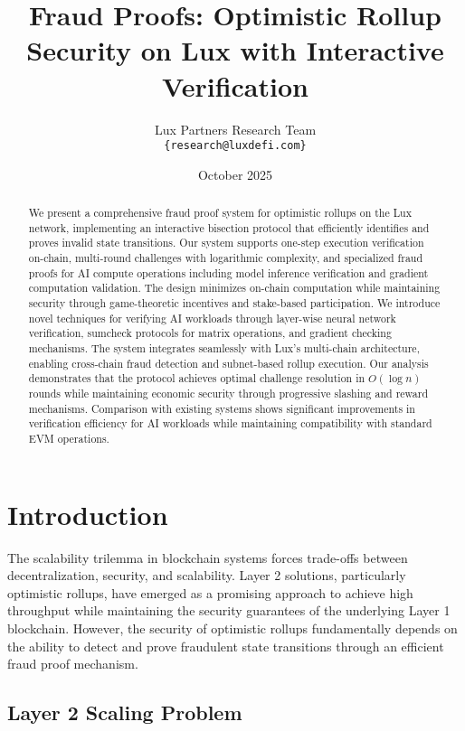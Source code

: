\documentclass[11pt,a4paper]{article}
\title{Fraud Proofs: Optimistic Rollup Security on Lux with Interactive Verification}
\author{Lux Partners Research Team\\
\texttt{\{research@luxdefi.com\}}}
\date{October 2025}
\theoremstyle{definition}
\begin{document}
\maketitle

\begin{abstract}
We present a comprehensive fraud proof system for optimistic rollups on the Lux network, implementing an interactive bisection protocol that efficiently identifies and proves invalid state transitions. Our system supports one-step execution verification on-chain, multi-round challenges with logarithmic complexity, and specialized fraud proofs for AI compute operations including model inference verification and gradient computation validation. The design minimizes on-chain computation while maintaining security through game-theoretic incentives and stake-based participation. We introduce novel techniques for verifying AI workloads through layer-wise neural network verification, sumcheck protocols for matrix operations, and gradient checking mechanisms. The system integrates seamlessly with Lux's multi-chain architecture, enabling cross-chain fraud detection and subnet-based rollup execution. Our analysis demonstrates that the protocol achieves optimal challenge resolution in $O(\log n)$ rounds while maintaining economic security through progressive slashing and reward mechanisms. Comparison with existing systems shows significant improvements in verification efficiency for AI workloads while maintaining compatibility with standard EVM operations.
\end{abstract}

\section{Introduction}

The scalability trilemma in blockchain systems forces trade-offs between decentralization, security, and scalability. Layer 2 solutions, particularly optimistic rollups, have emerged as a promising approach to achieve high throughput while maintaining the security guarantees of the underlying Layer 1 blockchain. However, the security of optimistic rollups fundamentally depends on the ability to detect and prove fraudulent state transitions through an efficient fraud proof mechanism.

\subsection{Layer 2 Scaling Problem}
\end{document}
